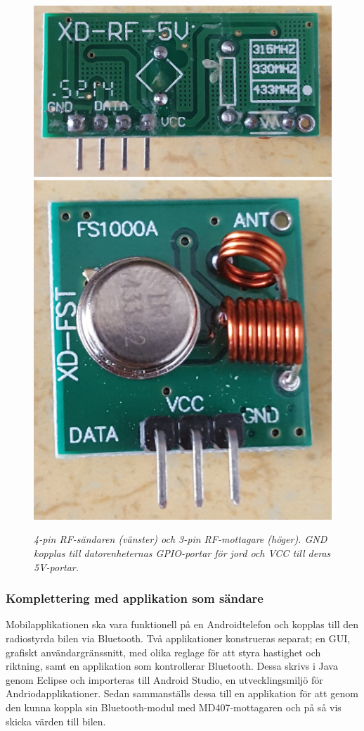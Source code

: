 \documentclass[a4paper]{article}
\begin{document}
\begin{figure}[H]
\includegraphics[scale=0.06]{RF-transmitter.jpg}
\includegraphics[scale=0.05]{RF-receiver.jpg}
\centering
\caption{\it 4-pin RF-sändaren (vänster) och 3-pin RF-mottagare (höger). GND kopplas till datorenheternas GPIO-portar för jord och VCC till deras 5V-portar.}
\end{figure} 


\subsubsection{Komplettering med applikation som sändare}
Mobilapplikationen ska vara funktionell på en Androidtelefon och kopplas till den radiostyrda bilen via Bluetooth. Två applikationer konstrueras separat; en GUI, grafiskt användargränssnitt, med olika reglage för att styra hastighet och riktning, samt en applikation som kontrollerar Bluetooth. Dessa skrivs i Java genom Eclipse och importeras till Android Studio, en utvecklingsmiljö för Andriodapplikationer. Sedan sammanställs dessa till en applikation för att genom den kunna koppla sin Bluetooth-modul med MD407-mottagaren och på så vis skicka värden till bilen.
\end{document}
